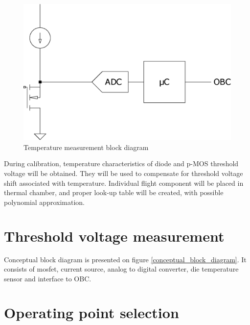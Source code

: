     \begin{figure}[H]
        \centering
        \includegraphics[width=0.3\paperwidth]{img/n-mos-temperature.eps}
        \caption{Temperature measurement block diagram}
        \label{Temperature_measurement_block_diagram}
    \end{figure}

    During calibration, temperature characteristics of diode and p-MOS threshold voltage will be obtained. They will be used to compensate for threshold voltage shift associated with temperature. Individual flight component will be placed in thermal chamber, and proper look-up table will be created, with possible polynomial approximation.


\section{Threshold voltage measurement}

Conceptual block diagram is presented on figure \ref{conceptual_block_diagram}. It consists of mosfet, current source, analog to digital converter, die temperature sensor and interface to OBC.





\section{Operating point selection}
